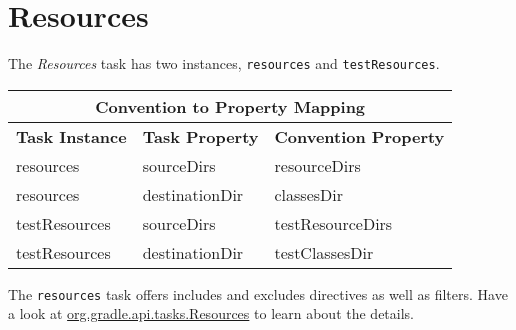\section{Resources} %
\label{sec:resources}
The \emph{Resources} task has two instances, \texttt{resources} and \texttt{testResources}. 
\begin{center}
	\begin{tabular}{|l|l|l|} \hline
		\multicolumn{3}{|c|}{Convention to Property Mapping} \\ \hline
		\textbf{Task Instance} & \textbf{Task Property} & \textbf{Convention Property} \\ \hline
		resources & sourceDirs & resourceDirs \\ \hline
		resources & destinationDir & classesDir \\ \hline
		testResources & sourceDirs & testResourceDirs \\ \hline
		testResources & destinationDir & testClassesDir \\ \hline
	\end{tabular} 
\end{center}
\noindent The \texttt{resources} task offers includes and excludes directives as well as filters. Have a look at \href{\API tasks/Resources.html}{org.gradle.api.tasks.Resources} to learn about the details.

